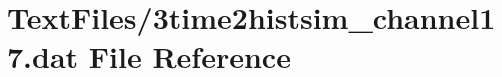 \hypertarget{3time2histsim__channel17_8dat}{}\section{Text\+Files/3time2histsim\+\_\+channel17.dat File Reference}
\label{3time2histsim__channel17_8dat}
